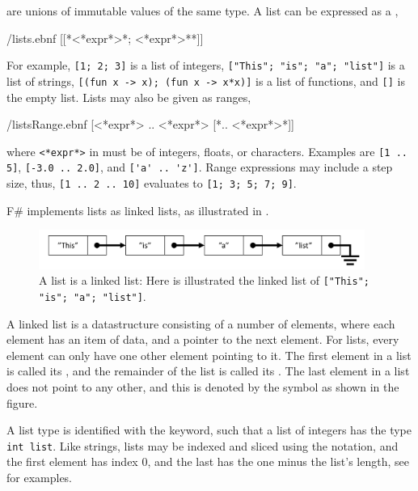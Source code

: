 \documentclass[fsharpNotes.tex]{subfiles}
\begin{document}
 are unions of immutable values of the same type. A list can be expressed as a ,
%
\begin{verbatimwrite}{\ebnf/lists.ebnf}
[[*<*expr*>{*; <*expr*>*}*]]
\end{verbatimwrite}
%
For example, \mbox{\lstinline![1; 2; 3]!} is a list of integers, \mbox{\lstinline!["This"; "is"; "a"; "list"]!} is a list of strings, \mbox{\lstinline![(fun x -> x); (fun x -> x*x)]!} is a list of functions, and \lstinline![]! is the empty list. Lists may also be given as ranges,
%
\begin{verbatimwrite}{\ebnf/listsRange.ebnf}
[<*expr*> .. <*expr*> [*.. <*expr*>*]]
\end{verbatimwrite}
%
where \lstinline[language=syntax]{<*expr*>} in  must be of integers, floats, or characters. Examples are \mbox{\lstinline![1 .. 5]!}, \mbox{\lstinline![-3.0 .. 2.0]!}, and \mbox{\lstinline!['a' .. 'z']!}. Range expressions may include a step size, thus, \mbox{\lstinline![1 .. 2 .. 10]!} evaluates to \mbox{\lstinline![1; 3; 5; 7; 9]!}.

F\# implements lists as linked lists, as illustrated in .
\begin{figure}
  \centering
  \includegraphics[width=0.95\textwidth]{linkedList}
  \caption{A list is a linked list: Here is illustrated the linked list of \mbox{\lstinline!["This"; "is"; "a"; "list"]!}.}
  \label{fig:linkedList}
\end{figure}
A linked list is a datastructure consisting of a number of elements, where each element has an item of data, and a pointer to the next element. For lists, every element can only have one other element pointing to it. The first element in a list is called its , and the remainder of the list is called its . The last element in a list does not point to any other, and this is denoted by the  symbol as shown in the figure. 

A list type is identified with the  keyword, such that a list of integers has the type \lstinline!int list!. Like strings, lists may be indexed and sliced using the \idx[{[]}@\lstinline{[]}]{\lexeme{[]}} notation, and the first element has index 0, and the last has the one minus the list's length, see  for examples.
%
%
\end{document}
